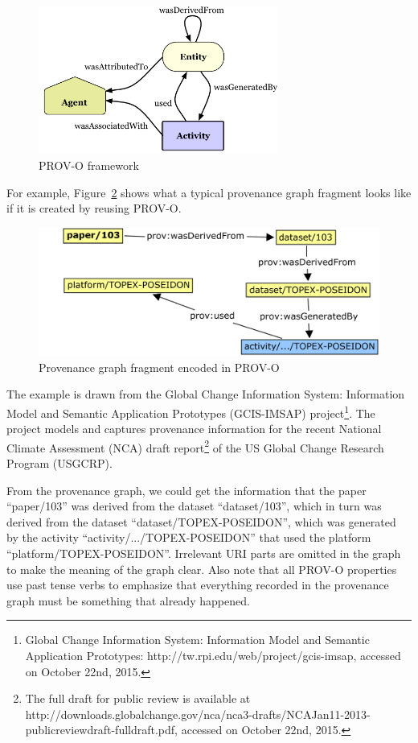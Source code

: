 \begin{figure}
	\centering
	\includegraphics[width=0.7\textwidth]{prov-o.png}
	\caption{PROV-O framework}
	\label{fig:prov-o}
\end{figure}
For example, Figure~\ref{fig:gcis} shows what a typical provenance graph fragment looks like if it is created by reusing PROV-O.
\begin{figure}
	\includegraphics[width=\textwidth]{gcis-prov.png}
	\caption{Provenance graph fragment encoded in PROV-O}
	\label{fig:gcis}
\end{figure}
The example is drawn from the Global Change Information System: Information Model and Semantic Application Prototypes (GCIS-IMSAP) project\footnote{Global Change Information System: Information Model and Semantic Application Prototypes: http://tw.rpi.edu/web/project/gcis-imsap, accessed on October 22nd, 2015.}. The project models and captures provenance information for the recent National Climate Assessment (NCA) draft report\footnote{The full draft for public review is available at http://downloads.globalchange.gov/nca/nca3-drafts/NCAJan11-2013-publicreviewdraft-fulldraft.pdf, accessed on October 22nd, 2015.} of the US Global Change Research Program (USGCRP).

From the provenance graph, we could get the information that the paper ``paper/103'' was derived from the dataset ``dataset/103'', which in turn was derived from the dataset ``dataset/TOPEX-POSEIDON'', which was generated by the activity ``activity/.../TOPEX-POSEIDON'' that used the platform ``platform/TOPEX-POSEIDON''. Irrelevant URI parts are omitted in the graph to make the meaning of the graph clear. Also note that all PROV-O properties use past tense verbs to emphasize that everything recorded in the provenance graph must be something that already happened.

